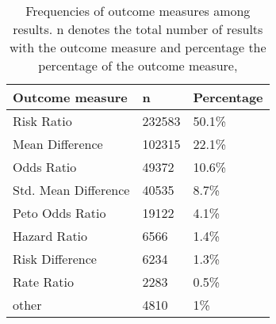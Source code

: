 \begin{table}[ht]
\centering
\begingroup\footnotesize
\begin{tabular}{lll}
  \hline
Outcome measure & n & Percentage \\ 
  \hline
Risk Ratio & 232583 & 50.1\% \\ 
  Mean Difference & 102315 & 22.1\% \\ 
  Odds Ratio & 49372 & 10.6\% \\ 
  Std. Mean Difference & 40535 & 8.7\% \\ 
  Peto Odds Ratio & 19122 & 4.1\% \\ 
  Hazard Ratio & 6566 & 1.4\% \\ 
  Risk Difference & 6234 & 1.3\% \\ 
  Rate Ratio & 2283 & 0.5\% \\ 
  other & 4810 & 1\% \\ 
   \hline
\end{tabular}
\endgroup
\caption{Frequencies of outcome measures among results. n denotes the total number 
             of results with the outcome measure and percentage the percentage of the outcome measure,} 
\label{outcome.measure.frequencies}
\end{table}



